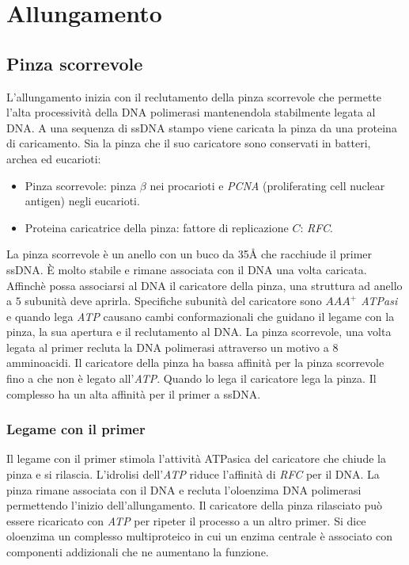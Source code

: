 \section{Allungamento}
\subsection{Pinza scorrevole}
L'allungamento inizia con il reclutamento della pinza scorrevole che permette l'alta processivit\`a della DNA polimerasi mantenendola stabilmente legata al DNA. A una sequenza di ssDNA
stampo viene caricata la pinza da una proteina di caricamento. Sia la pinza che il suo caricatore sono conservati in batteri, archea ed eucarioti: 
\begin{itemize}
	\item Pinza scorrevole: pinza $\beta$ nei procarioti e \emph{PCNA} (proliferating cell nuclear antigen) negli eucarioti. 
	\item Proteina caricatrice della pinza: fattore di replicazione $C$: \emph{RFC}.
\end{itemize}
La pinza scorrevole \`e un anello con un buco da \num{35}\si{\angstrom} che racchiude il primer ssDNA. \`E molto stabile e rimane associata con il DNA una volta caricata. Affinch\`e
possa associarsi al DNA il caricatore della pinza, una struttura ad anello a $5$ subunit\`a deve aprirla. Specifiche subunit\`a del caricatore sono \emph{$AAA^+$ ATPasi} e quando lega
\emph{ATP} causano cambi conformazionali che guidano il legame con la pinza, la sua apertura e il reclutamento al DNA. La pinza scorrevole, una volta legata al primer recluta
la DNA polimerasi attraverso un motivo a $8$ amminoacidi. Il caricatore della pinza ha bassa affinit\`a per la pinza scorrevole fino a che non \`e legato all'\emph{ATP}. Quando lo lega
il caricatore lega la pinza. Il complesso ha un alta affinit\`a per il primer a ssDNA. 
\subsubsection{Legame con il primer}
Il legame con il primer stimola l'attivit\`a ATPasica del caricatore che chiude la pinza e si rilascia. L'idrolisi dell'\emph{ATP} riduce l'affinit\`a di \emph{RFC} per il DNA. La
pinza rimane associata con il DNA e recluta l'oloenzima DNA polimerasi permettendo l'inizio dell'allungamento. Il caricatore della pinza rilasciato pu\`o essere ricaricato con
\emph{ATP} per ripeter il processo a un altro primer. Si dice oloenzima un complesso multiproteico in cui un enzima centrale \`e associato con componenti addizionali che ne aumentano 
la funzione. 
